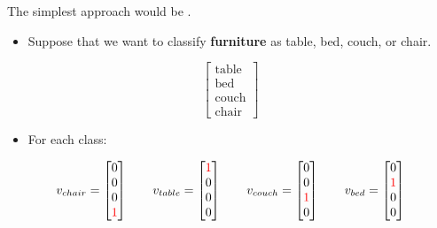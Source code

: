         The simplest approach would be .
            
        \begin{itemize}
            \item \miniex Suppose that we want to classify \textbf{furniture} as table, bed, couch, or chair.
        \end{itemize}
        
        \begin{equation}
            \begin{bmatrix}
              \text{table} \\ \text{bed} \\ \text{couch} \\ \text{chair} 
            \end{bmatrix}
        \end{equation}

        \begin{itemize}
            \item For each class:
        \end{itemize}
        
        
        \begin{equation}
            v_{chair} = 
            \begin{bmatrix}
              0\\0\\0\\ \textcolor{red}{1}
            \end{bmatrix}
            \qquad
            v_{table} = 
            \begin{bmatrix}
              \textcolor{red}{1}\\0\\0\\0
            \end{bmatrix}
            \qquad
            v_{couch} = 
            \begin{bmatrix}
              0\\0\\\textcolor{red}{1}\\0
            \end{bmatrix}
            \qquad
            v_{bed} = 
            \begin{bmatrix}
              0\\\textcolor{red}{1}\\0\\0
            \end{bmatrix}
        \end{equation}


